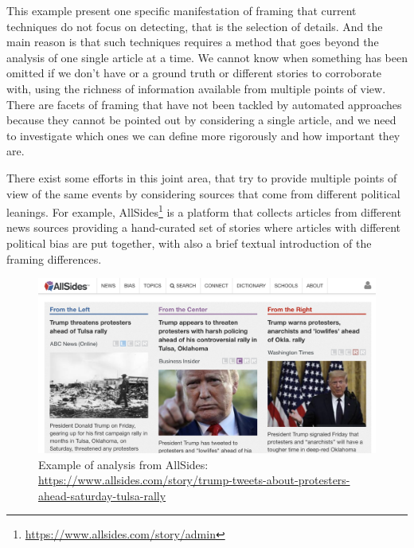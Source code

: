This example present one specific manifestation of framing that current techniques do not focus on detecting, that is the selection of details.
And the main reason is that such techniques requires a method that goes beyond the analysis of one single article at a time.
We cannot know when something has been omitted if we don't have or a ground truth or different stories to corroborate with, using the richness of information available from multiple points of view.
There are facets of framing that have not been tackled by automated approaches because they cannot be pointed out by considering a single article, and we need to investigate which ones we can define more rigorously and how important they are.

There exist some efforts in this joint area, that try to provide multiple points of view of the same events by considering sources that come from different political leanings.
For example, AllSides\footnote{\url{https://www.allsides.com/story/admin}} is a platform that collects articles from different news sources providing a hand-curated set of stories where articles with different political bias are put together, with also a brief textual introduction of the framing differences.

\begin{figure}[!htb]
    \centering
    \includegraphics[width=\linewidth]{figures/allsides.png}
    \caption{Example of analysis from AllSides: \url{https://www.allsides.com/story/trump-tweets-about-protesters-ahead-saturday-tulsa-rally}}
    \label{fig:allsides}
\end{figure}

